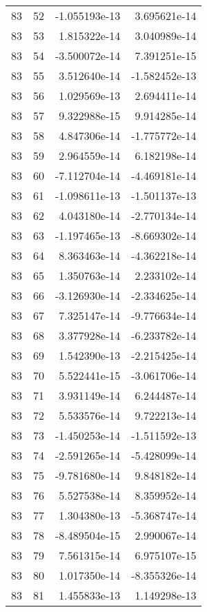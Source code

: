 \begin{tabular}{rrrr}
  83 &   52 & -1.055193e-13 &  3.695621e-14 \\
  83 &   53 &  1.815322e-14 &  3.040989e-14 \\
  83 &   54 & -3.500072e-14 &  7.391251e-15 \\
  83 &   55 &  3.512640e-14 & -1.582452e-13 \\
  83 &   56 &  1.029569e-13 &  2.694411e-14 \\
  83 &   57 &  9.322988e-15 &  9.914285e-14 \\
  83 &   58 &  4.847306e-14 & -1.775772e-14 \\
  83 &   59 &  2.964559e-14 &  6.182198e-14 \\
  83 &   60 & -7.112704e-14 & -4.469181e-14 \\
  83 &   61 & -1.098611e-13 & -1.501137e-13 \\
  83 &   62 &  4.043180e-14 & -2.770134e-14 \\
  83 &   63 & -1.197465e-13 & -8.669302e-14 \\
  83 &   64 &  8.363463e-14 & -4.362218e-14 \\
  83 &   65 &  1.350763e-14 &  2.233102e-14 \\
  83 &   66 & -3.126930e-14 & -2.334625e-14 \\
  83 &   67 &  7.325147e-14 & -9.776634e-14 \\
  83 &   68 &  3.377928e-14 & -6.233782e-14 \\
  83 &   69 &  1.542390e-13 & -2.215425e-14 \\
  83 &   70 &  5.522441e-15 & -3.061706e-14 \\
  83 &   71 &  3.931149e-14 &  6.244487e-14 \\
  83 &   72 &  5.533576e-14 &  9.722213e-14 \\
  83 &   73 & -1.450253e-14 & -1.511592e-13 \\
  83 &   74 & -2.591265e-14 & -5.428099e-14 \\
  83 &   75 & -9.781680e-14 &  9.848182e-14 \\
  83 &   76 &  5.527538e-14 &  8.359952e-14 \\
  83 &   77 &  1.304380e-13 & -5.368747e-14 \\
  83 &   78 & -8.489504e-15 &  2.990067e-14 \\
  83 &   79 &  7.561315e-14 &  6.975107e-15 \\
  83 &   80 &  1.017350e-14 & -8.355326e-14 \\
  83 &   81 &  1.455833e-13 &  1.149298e-13 \\

\end{tabular}
